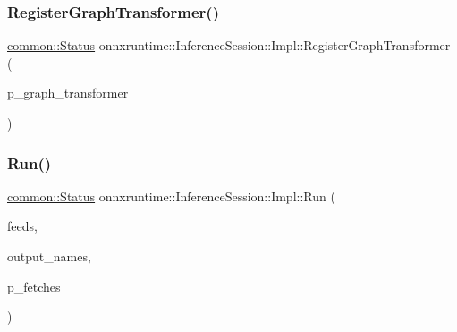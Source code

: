 \subsubsection{\texorpdfstring{Register\+Graph\+Transformer()}{RegisterGraphTransformer()}}
{\footnotesize\ttfamily \mbox{\hyperlink{classonnxruntime_1_1common_1_1Status}{common\+::\+Status}} onnxruntime\+::\+Inference\+Session\+::\+Impl\+::\+Register\+Graph\+Transformer (\begin{DoxyParamCaption}\item[{std\+::unique\+\_\+ptr$<$ \mbox{\hyperlink{classonnxruntime_1_1GraphTransformer}{onnxruntime\+::\+Graph\+Transformer}} $>$}]{p\+\_\+graph\+\_\+transformer }\end{DoxyParamCaption})\hspace{0.3cm}{\ttfamily [inline]}}

\mbox{\label{classonnxruntime_1_1InferenceSession_1_1Impl_a3638c45d73a93fff19578b4e1be0fc34}} 
\subsubsection{\texorpdfstring{Run()}{Run()}\hspace{0.1cm}{\footnotesize\ttfamily [1/4]}}
{\footnotesize\ttfamily \mbox{\hyperlink{classonnxruntime_1_1common_1_1Status}{common\+::\+Status}} onnxruntime\+::\+Inference\+Session\+::\+Impl\+::\+Run (\begin{DoxyParamCaption}\item[{const \mbox{\hyperlink{namespaceonnxruntime_a48b01f0410ec8d693dbd40d1132bd66c}{Name\+M\+L\+Val\+Map}} \&}]{feeds,  }\item[{const std\+::vector$<$ std\+::string $>$ \&}]{output\+\_\+names,  }\item[{std\+::vector$<$ \mbox{\hyperlink{classonnxruntime_1_1MLValue}{M\+L\+Value}} $>$ $\ast$}]{p\+\_\+fetches }\end{DoxyParamCaption})\hspace{0.3cm}{\ttfamily [inline]}}

\mbox{\label{classonnxruntime_1_1InferenceSession_1_1Impl_aec73d9664448eece9c2627d4d378a302}} 
